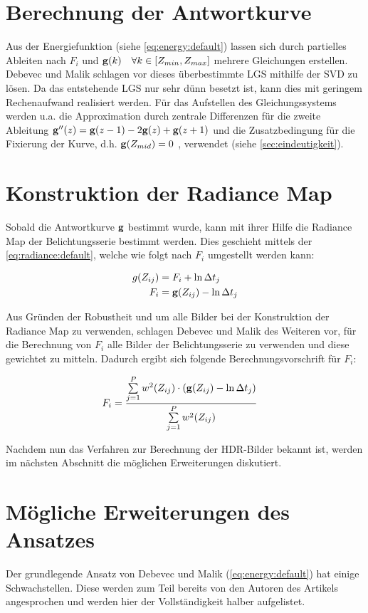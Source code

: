 \section{Berechnung der Antwortkurve}
Aus der Energiefunktion (siehe \autoref{eq:energy:default}) lassen sich durch partielles Ableiten nach $F_i$ und $\mathbf g(k) \quad \forall k \in [Z_{min}, Z_{max}]$ mehrere Gleichungen erstellen. Debevec und Malik schlagen vor dieses überbestimmte \gls{LGS} mithilfe der \gls{SVD} zu lösen. Da das entstehende \gls{LGS} nur sehr dünn besetzt ist, kann dies mit geringem Rechenaufwand realisiert werden. Für das Aufstellen des Gleichungssystems werden u.a. die Approximation durch zentrale Differenzen für die zweite Ableitung $\mathbf{g}''(z) = \mathbf g(z-1)-2\mathbf g(z)+\mathbf g(z+1)$ und die Zusatzbedingung für die Fixierung der Kurve, d.h. $\mathbf g(Z_{mid}) = 0$ , verwendet (siehe \autoref{sec:eindeutigkeit}).


\section{Konstruktion der Radiance Map}
\label{sec:algo:radiance}
Sobald die Antwortkurve $\mathbf g$ bestimmt wurde, kann mit ihrer Hilfe die \gls{Radiance Map} der Belichtungsserie bestimmt werden. Dies geschieht mittels der \autoref{eq:radiance:default}, welche wie folgt nach $F_i$ umgestellt werden kann: 

\begin{align}
\label{eq:radiance:default}
g(Z_{ij}) &= F_i + \ln \Delta t_j\\
F_i &= \mathbf g(Z_{ij})-\ln \Delta t_j
\end{align}

Aus Gründen der Robustheit und um alle Bilder bei der Konstruktion der \gls{Radiance Map} zu verwenden, schlagen Debevec und Malik des Weiteren vor, für die Berechnung von $F_i$ alle Bilder der Belichtungsserie zu verwenden und diese gewichtet zu mitteln. Dadurch ergibt sich folgende Berechnungsvorschrift für $F_i$: 


\begin{align}
\label{eq:radiance:weight}
F_i &= \frac{\sum \limits_{j=1}^P w^2(Z_{ij}) \cdot (\mathbf g(Z_{ij})-\ln \Delta t_j)}{\sum \limits_{j=1}^P w^2(Z_{ij})}
\end{align}

Nachdem nun das Verfahren zur Berechnung der \gls{HDR}-Bilder bekannt ist, werden im nächsten Abschnitt die möglichen Erweiterungen diskutiert.

\section{Mögliche Erweiterungen des Ansatzes}
\label{algo:schwachstellen}
Der grundlegende Ansatz von Debevec und Malik (\autoref{eq:energy:default}) hat einige Schwachstellen. Diese werden zum Teil bereits von den Autoren des Artikels angesprochen und werden hier der Vollständigkeit halber aufgelistet.

